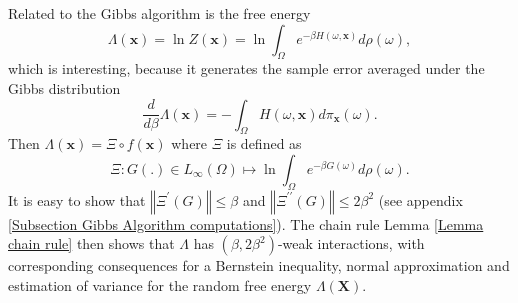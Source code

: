 \documentclass[final,12pt]{colt2018} %
\begin{document}
						Related to the Gibbs algorithm is the free energy%
						\begin{equation*}
						\Lambda \left( \mathbf{x}\right) =\ln Z\left( \mathbf{x}\right) =\ln
						\int_{\Omega }e^{-\beta H\left( \omega ,\mathbf{x}\right) }d\rho \left(
						\omega \right) , 
						\end{equation*}%
						which is interesting, because it generates the sample error averaged under
						the Gibbs distribution 
						\begin{equation*}
						\frac{d}{d\beta }\Lambda \left( \mathbf{x}\right) =-\int_{\Omega }H\left(
						\omega ,\mathbf{x}\right) d\pi _{\mathbf{x}}\left( \omega \right) . 
						\end{equation*}%
						Then $\Lambda \left( \mathbf{x}\right) =\Xi \circ f\left( \mathbf{x}%
						\right) $ where $\Xi $ is defined as%
						\begin{equation*}
						\Xi :G\left( .\right) \in L_{\infty }\left( \Omega \right) \mapsto \ln
						\int_{\Omega }e^{-\beta G\left( \omega \right) }d\rho \left( \omega \right) .
						\end{equation*}%
						It is easy to show that $\left\Vert \Xi ^{\prime }\left( G\right)
						\right\Vert \leq \beta $ and $\left\Vert \Xi ^{\prime \prime }\left(
						G\right) \right\Vert \leq 2\beta ^{2}$ (see appendix \ref{Subsection
							Gibbs Algorithm computations}). The chain rule Lemma \ref{Lemma chain rule}
						then shows that $\Lambda $ has $\left( \beta ,2\beta ^{2}\right) $-weak
						interactions, with corresponding consequences for a Bernstein inequality,
						normal approximation and estimation of variance for the random free energy $%
						\Lambda \left( \mathbf{X}\right) $.
						
\end{document}

